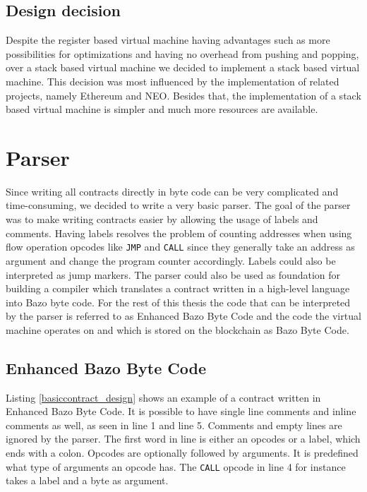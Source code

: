\subsection{Design decision}
Despite the register based virtual machine having advantages such as more possibilities for optimizations and having no overhead from pushing and popping, over a stack based virtual machine we decided to implement a stack based virtual machine. This decision was most influenced by the implementation of related projects, namely Ethereum and NEO. Besides that, the implementation of a stack based virtual machine is simpler and much more resources are available.

\section{Parser}
Since writing all contracts directly in byte code can be very complicated and time-consuming, we decided to write a very basic parser. The goal of the parser was to make writing contracts easier by allowing the usage of labels and comments. Having labels resolves the problem of counting addresses when using flow operation opcodes like \texttt{JMP} and \texttt{CALL} since they generally take an address as argument and change the program counter accordingly. Labels could also be interpreted as jump markers. The parser could also be used as foundation for building a compiler which translates a contract written in a high-level language into Bazo byte code. For the rest of this thesis the code that can be interpreted by the parser is referred to as \flqq Enhanced Bazo Byte Code\frqq{} and the code the virtual machine operates on and which is stored on the blockchain as \flqq Bazo Byte Code\frqq.

\subsection{\flqq Enhanced Bazo Byte Code\frqq{}}
Listing \ref{basiccontract_design} shows an example of a contract written in \flqq Enhanced Bazo Byte Code\frqq{}. It is possible to have single line comments and inline comments as well, as seen in line 1 and line 5. Comments and empty lines are ignored by the parser. The first word in line is either an opcodes or a label, which ends with a colon. Opcodes are optionally followed by arguments. It is predefined what type of arguments an opcode has. The \texttt{CALL} opcode in line 4 for instance takes a label and a byte as argument.

